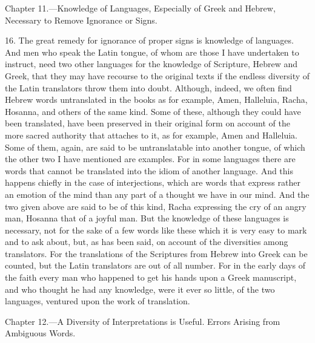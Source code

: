 
Chapter 11.—Knowledge of Languages, Especially of Greek and Hebrew, Necessary to Remove Ignorance or Signs.

16. The great remedy for ignorance of proper signs is knowledge of languages. And men who speak the Latin tongue, of whom  are those I have undertaken to instruct, need two other languages for the knowledge of Scripture, Hebrew and Greek, that they may have recourse to the original texts if the endless diversity of the Latin translators throw them into doubt. Although, indeed, we often find Hebrew words untranslated in the books as for example, Amen, Halleluia, Racha, Hosanna, and others of the same kind. Some of these, although they could have been translated, have been preserved in their original form on account of the more sacred authority that attaches to it, as for example, Amen and Halleluia. Some of them, again, are said to be untranslatable into another tongue, of which the other two I have mentioned are examples. For in some languages there are words that cannot be translated into the idiom of another language. And this happens chiefly in the case of interjections, which are words that express rather an emotion of the mind than any part of a thought we have in our mind. And the two given above are said to be of this kind, Racha expressing the cry of an angry man, Hosanna that of a joyful man. But the knowledge of these languages is necessary, not for the sake of a few words like these which it is very easy to mark and to ask about, but, as has been said, on account of the diversities among translators. For the translations of the Scriptures from Hebrew into Greek can be counted, but the Latin translators are out of all number. For in the early days of the faith every man who happened to get his hands upon a Greek manuscript, and who thought he had any knowledge, were it ever so little, of the two languages, ventured upon the work of translation.


Chapter 12.—A Diversity of Interpretations is Useful. Errors Arising from Ambiguous Words.


